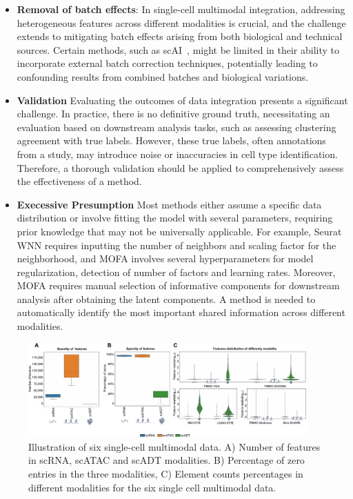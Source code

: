 \begin{itemize}
	\item \textbf{Removal of batch effects}:
	In single-cell multimodal integration, addressing heterogeneous features across different modalities is crucial, and the challenge extends to mitigating batch effects arising from both biological and technical sources. Certain methods, such as scAI~\citep{jin2020scai}, might be limited in their ability to incorporate external batch correction techniques, potentially leading to confounding results from combined batches and biological variations.

	\item \textbf{Validation}
	Evaluating the outcomes of data integration presents a significant challenge. In practice, there is no definitive ground truth, necessitating an evaluation based on downstream analysis tasks, such as assessing clustering agreement with true labels. However, these true labels, often annotations from a study, may introduce noise or inaccuracies in cell type identification. Therefore, a thorough validation should be applied to comprehensively assess the effectiveness of a method.

  \item \textbf{Execessive Presumption}
  Most methods either assume a specific data distribution or involve fitting the model with several parameters, requiring prior knowledge that may not be universally applicable. For example, Seurat WNN requires inputting the number of neighbors and scaling factor for the neighborhood, and MOFA involves several hyperparameters for model regularization, detection of number of factors and learning rates. Moreover, MOFA requires manual selection of informative components for downstream analysis after obtaining the latent components. A method is needed to automatically identify the most important shared information across different modalities.

\end{itemize}

\begin{figure}[!ht]
	\centering
	\includegraphics[width=0.95\textwidth]{feature_statistic/fig}
	\vspace{0.1cm}
	\caption[features characteristics comparison showing the challenge of multimodal integration.]{Illustration of six single-cell multimodal data. A) Number of features in scRNA, scATAC and scADT modalities. B) Percentage of zero entries in the three modalities, C) Element counts percentages in different modalities for the six single cell multimodal data.}
	\label{fig:modalities_differences}
\end{figure}

